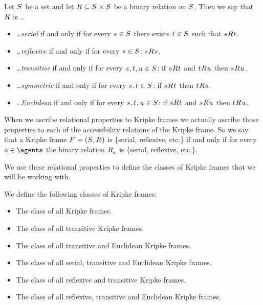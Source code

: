 \begin{definition}
Let $\kStates$ be a set and let $\kAccessibilityRel \subseteq \kStates \times \kStates$ be a binary relation on $\kStates$. 
Then we say that $\kAccessibilityRel$ is \ldots
\begin{itemize}
    \item \ldots {\em serial} if and only if for every $\kStateS \in \kStates$ there exists $\kStateT \in \kStates$ such that $\kStateS \kAccessibility{} \kStateT$.
    \item \ldots {\em reflexive} if and only if for every $\kStateS \in \kStates$: $\kStateS \kAccessibility{} \kStateS$.
    \item \ldots {\em transitive} if and only if for every $\kStateS, \kStateT, \kStateU \in \kStates$: if $\kStateS \kAccessibility{} \kStateT$ and $\kStateT \kAccessibility{} \kStateU$ then $\kStateS \kAccessibility{} \kStateU$.
    \item \ldots {\em symmetric} if and only if for every $\kStateS, \kStateT \in \kStates$: if $\kStateS \kAccessibility{} \kStateT$ then $\kStateT \kAccessibility{} \kStateS$.
    \item \ldots {\em Euclidean} if and only if for every $\kStateS, \kStateT, \kStateU \in \kStates$: if $\kStateS \kAccessibility{} \kStateT$ and $\kStateS \kAccessibility{} \kStateU$ then $\kStateT \kAccessibility{} \kStateU$.
\end{itemize}
\end{definition}

When we ascribe relational properties to Kripke frames we actually ascribe those properties to each of the accessibility relations of the Kripke frame.
So we say that a Kripke frame $\kFrameAndTuple$ is \{serial, reflexive, etc.\} if and only if for every $\agentA \in \agents$ the binary relation $\kAccessibilityA$ is \{serial, reflexive, etc.\}.

We use these relational properties to define the classes of Kripke frames that we will be working with.

\begin{definition}
We define the following classes of Kripke frames:
\begin{itemize}
    \item The class \classK{} of all Kripke frames.
    \item The class \classKF{} of all transitive Kripke frames.
    \item The class \classKFF{} of all transitive and Euclidean Kripke frames.
    \item The class \classKD{} of all serial, transitive and Euclidean Kripke frames.
    \item The class \classSF{} of all reflexive and transitive Kripke frames.
    \item The class \classS{} of all reflexive, transitive and Euclidean Kripke frames.
\end{itemize}
\end{definition}

